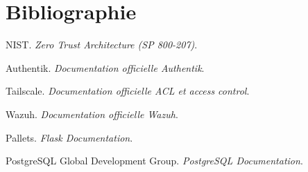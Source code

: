 \chapter*{Bibliographie}

NIST. \emph{Zero Trust Architecture (SP 800-207)}.

Authentik. \emph{Documentation officielle Authentik}.

Tailscale. \emph{Documentation officielle ACL et access control}.

Wazuh. \emph{Documentation officielle Wazuh}.

Pallets. \emph{Flask Documentation}.

PostgreSQL Global Development Group. \emph{PostgreSQL Documentation}.


